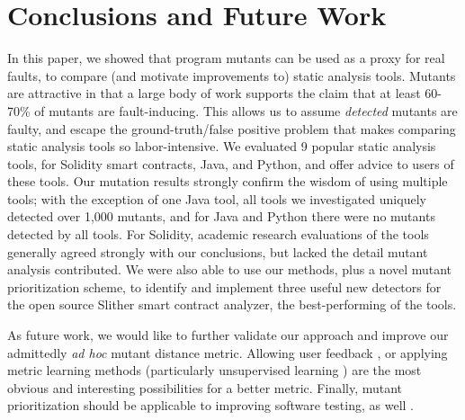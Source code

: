 \section{Conclusions and Future Work}

In this paper, we showed that program mutants can be used as a proxy
for real faults, to compare (and motivate improvements to) static
analysis tools.  Mutants are attractive in that a large body of work supports the
claim that at least 60-70\% of mutants are fault-inducing.   This
allows us to assume \emph{detected} mutants are faulty, and escape the
ground-truth/false positive problem that makes comparing static
analysis tools so labor-intensive.   We
evaluated 9 popular static analysis tools, for Solidity smart contracts, Java,
and Python, and offer advice to users of these tools.  Our mutation
results strongly confirm the wisdom of using multiple tools; with the
exception of one Java tool, all tools we investigated uniquely
detected over 1,000 mutants, and for Java and Python there were no
mutants detected by all tools. For Solidity,
academic research evaluations of the tools generally agreed strongly
with our conclusions, but lacked the detail mutant analysis contributed.
We were also able to use our methods, plus a novel mutant prioritization scheme, to
identify and implement three useful new detectors for the open source Slither smart contract
analyzer, the best-performing of the tools.

As future work, we would like to further validate our approach and
improve our admittedly \emph{ad hoc} mutant distance metric.  Allowing
user feedback \cite{EndUserMistake,OnlyOracle}, or applying metric
learning methods \cite{kulis2012metric} (particularly unsupervised
learning \cite{scholkopf1998nonlinear,tipping1999probabilistic}) are
the most obvious and interesting possibilities for a better metric.
Finally, mutant prioritization should be applicable to improving
software testing, as well \cite{groce2018verified}.

